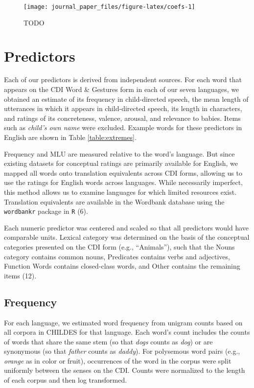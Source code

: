 \documentclass[9pt,twocolumn,twoside]{pnas-new}
\begin{document}
\begin{figure*}

{\centering \texttt{[image: journal\_paper\_files/figure-latex/coefs-1]} 

}

\caption{TODO}\label{fig:coefs}
\end{figure*}

\section*{Predictors}\label{predictors}

Each of our predictors is derived from independent sources. For each
word that appears on the CDI Word \& Gestures form in each of our seven
languages, we obtained an estimate of its frequency in child-directed
speech, the mean length of utterances in which it appears in
child-directed speech, its length in characters, and ratings of its
concreteness, valence, arousal, and relevance to babies. Items such as
\emph{child's own name} were excluded. Example words for these
predictors in English are shown in Table \ref{table:extremes}.

Frequency and MLU are measured relative to the word's language. But
since existing datasets for conceptual ratings are primarily available
for English, we mapped all words onto translation equivalents across CDI
forms, allowing us to use the ratings for English words across
languages. While necessarily imperfect, this method allows us to examine
languages for which limited resources exist. Translation equivalents are
available in the Wordbank database using the \texttt{wordbankr} package
in \texttt{R} (6).

Each numeric predictor was centered and scaled so that all predictors
would have comparable units. Lexical category was determined on the
basis of the conceptual categories presented on the CDI form (e.g.,
``Animals''), such that the Nouns category contains common nouns,
Predicates contains verbs and adjectives, Function Words contains
closed-class words, and Other contains the remaining items (12).

\subsection{Frequency}\label{frequency}

For each language, we estimated word frequency from unigram counts based
on all corpora in CHILDES for that language. Each word's count includes
the counts of words that share the same stem (so that \emph{dogs} counts
as \emph{dog}) or are synonymous (so that \emph{father} counts as
\emph{daddy}). For polysemous word pairs (e.g., \emph{orange} as in
color or fruit), occurrences of the word in the corpus were split
uniformly between the senses on the CDI. Counts were normalized to the
length of each corpus and then log transformed.
\end{document}
